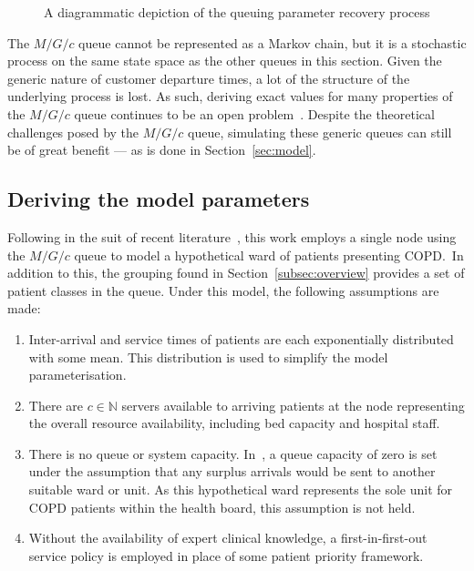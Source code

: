 \documentclass[]{interact}
\theoremstyle{plain}%
\theoremstyle{definition}
\theoremstyle{remark}
\begin{document}
\begin{figure}
    \centering%
    \resizebox{!}{.9\textheight}{}
    \caption{%
        A diagrammatic depiction of the queuing parameter recovery process
    }\label{fig:process}
\end{figure}

The \(M/G/c\) queue cannot be represented as a Markov chain, but it is a
stochastic process on the same state space as the other queues in this section.
Given the generic nature of customer departure times, a lot of the structure of
the underlying process is lost. As such, deriving exact values for many
properties of the \(M/G/c\) queue continues to be an open
problem~\citep{Kingman2009}. Despite the theoretical challenges posed by the
\(M/G/c\) queue, simulating these generic queues can still be of great benefit
--- as is done in Section~\ref{sec:model}. 

\subsection{Deriving the model parameters}\label{subsec:derive}

Following in the suit of recent literature~\citep{Steins2013,Williams2015}, this
work employs a single node using the \(M/G/c\) queue to model a hypothetical
ward of patients presenting COPD.\ In addition to this, the grouping found in
Section~\ref{subsec:overview} provides a set of patient classes in the queue.
Under this model, the following assumptions are made:

\begin{enumerate}
    \item Inter-arrival and service times of patients are each exponentially
        distributed with some mean. This distribution is used to simplify the
        model parameterisation.
    \item There are \(c \in \mathbb{N}\) servers available to arriving patients
        at the node representing the overall resource availability, including
        bed capacity and hospital staff.
    \item There is no queue or system capacity. In~\cite{Williams2015}, a
        queue capacity of zero is set under the assumption that any surplus
        arrivals would be sent to another suitable ward or unit. As this
        hypothetical ward represents the sole unit for COPD patients within the
        health board, this assumption is not held.
    \item Without the availability of expert clinical knowledge, a
        first-in-first-out service policy is employed in place of some patient
        priority framework.
\end{enumerate}
\end{document}
